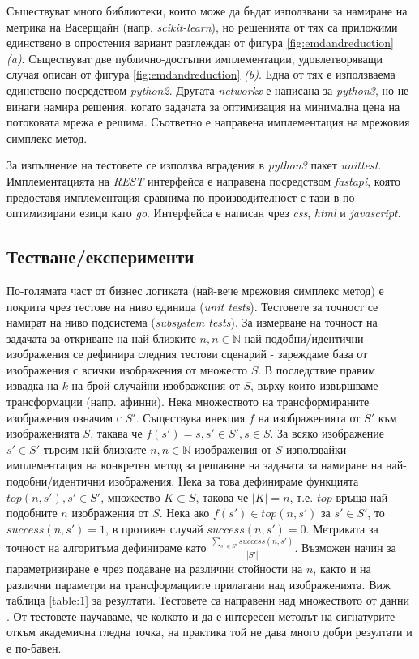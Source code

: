 \documentclass[a4paper,12pt]{article}
\begin{document}
\bigbreak

Съществуват много библиотеки, които може да бъдат използвани за намиране на метрика на Васерщайн (напр. \textit{scikit-learn}), но решенията от тях са приложими единствено в опростения вариант разглеждан от фигура \ref{fig:emdandreduction} \textit{(a)}. Съществуват две публично-достъпни имплементации, удовлетворяващи случая описан от фигура \ref{fig:emdandreduction} \textit{(b)}. Една от тях е използваема единствено посредством \textit{python2}. Другата \textit{networkx} е написана за \textit{python3}, но не винаги намира решения, когато задачата за оптимизация на минимална цена на потоковата мрежа е решима. Съответно е направена имплементация на мрежовия симплекс метод.

\bigbreak

За изпълнение на тестовете се използва вградения в \textit{python3} пакет \textit{unittest}. Имплементацията на \textit{REST} интерфейса е направена посредством \textit{fastapi}, която предоставя имплементация сравнима по производителност с тази в по-оптимизирани езици като \textit{go}. Интерфейса е написан чрез \textit{css}, \textit{html} и \textit{javascript}.

\subsection{Тестване/експерименти}

По-голямата част от бизнес логиката (най-вече мрежовия симплекс метод) е покрита чрез тестове на ниво единица (\textit{unit tests}). Тестовете за точност се намират на ниво подсистема (\textit{subsystem tests}). За измерване на точност на задачата за откриване на най-близките $n, n \in \mathbb{N}$ най-подобни/идентични изображения се дефинира следния тестови сценарий - зареждаме база от изображения с всички изображения от множесто $S$. В последствие правим извадка на $k$ на брой случайни изображения от $S$, върху които извършваме трансформации (напр. афинни). Нека множеството на трансформираните изображения означим с $S'$. Съществува инекция $f$ на изображенията от $S'$ към изображенията $S$, такава че $f(s') = s, s' \in S', s \in S$. За всяко изображение $s' \in S'$ търсим най-близките $n, n \in \mathbb{N}$ изображения от $S$ използвайки имплементация на конкретен метод за решаване на задачата за намиране на най-подобни/идентични изображения. Нека за това дефинираме функцията $top(n, s'), s' \in S'$, множество $K \subset S$, такова че $|K| = n$, т.е. $top$ връща най-подобните $n$ изображения от $S$. Нека ако $f(s') \in top(n, s')$ за $s' \in S'$, то $success(n, s') = 1$, в противен случай $success(n, s') = 0$. Метриката за точност на алгоритъма дефинираме като $\frac{\sum_{s' \in S'} success(n, s')}{|S'|}$. Възможен начин за параметризиране е чрез подаване на различни стойности на $n$, както и на различни параметри на трансформациите прилагани над изображенията. Виж таблица \ref{table:1} за резултати. Тестовете са направени над множеството от данни . От тестовете научаваме, че колкото и да е интересен методът на сигнатурите откъм академична гледна точка, на практика той не дава много добри резултати и е по-бавен.
\end{document}
